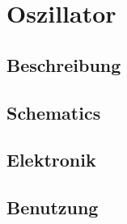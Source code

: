 \section{Oszillator}
\label{sec:orgd73ed82}
\subsection{Beschreibung}
\label{sec:orgfcca2df}
\subsection{Schematics}
\label{sec:org452e38a}
\subsection{Elektronik}
\label{sec:orgd5e4ddb}
\subsection{Benutzung}
\label{sec:org6bb74f5}
